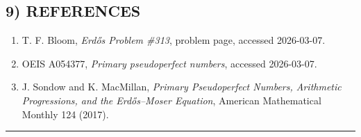 \subsection*{9) REFERENCES}
\begin{enumerate}
\item T. F. Bloom, \emph{Erd\H{o}s Problem \#313}, problem page, accessed 2026-03-07.
\item OEIS A054377, \emph{Primary pseudoperfect numbers}, accessed 2026-03-07.
\item J. Sondow and K. MacMillan, \emph{Primary Pseudoperfect Numbers, Arithmetic Progressions, and the Erd\H{o}s--Moser Equation}, American Mathematical Monthly 124 (2017).
\end{enumerate}

\bigskip
\hrule
\bigskip


